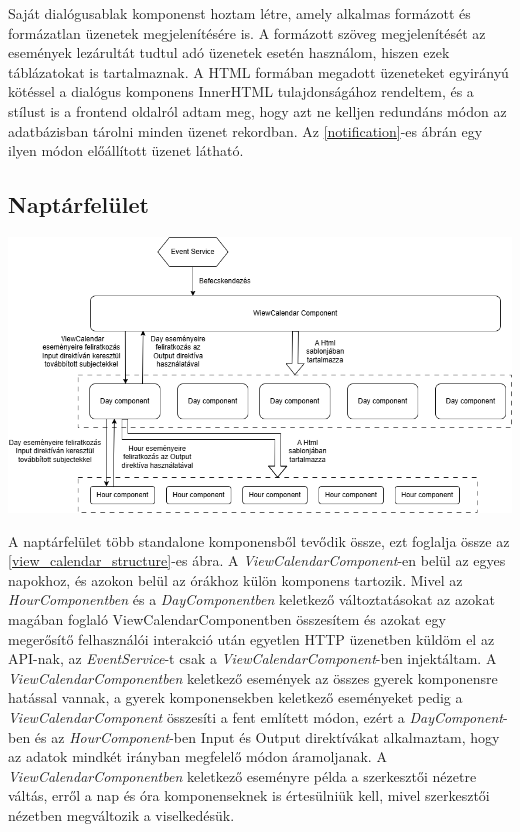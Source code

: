 \documentclass[a4paper,12pt]{report}
\theoremstyle{definition}
\theoremstyle{remark}
\begin{document}
Saját dialógusablak komponenst hoztam létre, amely alkalmas formázott és formázatlan üzenetek megjelenítésére is. A formázott szöveg megjelenítését az események lezárultát tudtul adó üzenetek esetén használom, hiszen ezek táblázatokat is tartalmaznak.  A HTML formában megadott üzeneteket egyirányú kötéssel a dialógus komponens InnerHTML tulajdonságához rendeltem, és a stílust is a frontend oldalról adtam meg, hogy azt ne kelljen redundáns módon az adatbázisban tárolni minden üzenet rekordban. Az \ref{notification}-es ábrán egy ilyen módon előállított üzenet látható.

	\subsection{Naptárfelület}

\begin{center}
\includegraphics[width=150mm]{view_calendar_structure}
\captionsetup{width=0.8\linewidth}
\label{view_calendar_structure}
\end{center}

A naptárfelület több standalone komponensből tevődik össze, ezt foglalja össze az \ref{view_calendar_structure}-es ábra. A \textit{ViewCalendarComponent}-en belül az egyes napokhoz, és azokon belül az órákhoz külön komponens tartozik. Mivel az \textit{HourComponentben} és a\textit{ DayComponentben} keletkező változtatásokat az azokat magában foglaló ViewCalendarComponentben összesítem és azokat egy megerősítő felhasználói interakció után egyetlen HTTP üzenetben küldöm el az API-nak, az \textit{EventService}-t csak a \textit{ViewCalendarComponent}-ben injektáltam. A \textit{ViewCalendarComponentben} keletkező események az összes gyerek komponensre hatással vannak, a gyerek komponensekben keletkező eseményeket pedig a \textit{ViewCalendarComponent} összesíti a fent említett módon, ezért a \textit{DayComponent}-ben és az \textit{HourComponent}-ben Input és Output direktívákat alkalmaztam, hogy az adatok mindkét irányban megfelelő módon áramoljanak. A \textit{ViewCalendarComponentben} keletkező eseményre példa a szerkesztői nézetre váltás, erről a nap és óra komponenseknek is értesülniük kell, mivel szerkesztői nézetben megváltozik a viselkedésük.
\end{document}
